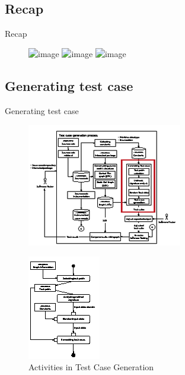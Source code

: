 \documentclass{beamer}
\begin{document}
\subsection{Recap}
\begin{frame}{Recap}
    \begin{figure}
        \includegraphics<1>[height=0.8\paperheight]{figure/1st-phase-1}
        \includegraphics<2>[height=0.8\paperheight]{figure/1st-phase-2}
        \includegraphics<3>[height=0.8\paperheight]{figure/1st-phase-3}
    \end{figure}
\end{frame}

\subsection{Generating test case}
\begin{frame}{Generating test case}
    \begin{figure}
        \includegraphics[height=0.8\paperheight]{figure/Methodology-Highlight-1}
    \end{figure}
\end{frame}

\begin{frame}
    \begin{figure}
        \includegraphics[height=.8\paperheight]{figure/Activities}
        \caption{Activities in Test Case Generation}
        \label{fig:testcasegenearation}
    \end{figure}
\end{frame}
\end{document}
